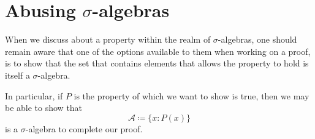 \documentclass[notoc,notitlepage]{tufte-book}
\begin{document}
\section{Abusing \texorpdfstring{$\sigma$}{sigma}-algebras}%
\label{sec:abusing_sigma_algebras}

When we discuss about a property within the realm of $\sigma$-algebras,
one should remain aware that one of the options available to them
when working on a proof, is to show that the set that contains elements
that allows the property to hold is itself a $\sigma$-algebra.

In particular, if $P$ is the property of which we want to show is true,
then we may be able to show that
\begin{equation*}
  \mathcal{A} \coloneqq \{ x : P(x) \}
\end{equation*}
is a $\sigma$-algebra to complete our proof.


\backmatter

\fancyhead[LE]{\thepage \enspace \textsl{\leftmark}}



\printindex
\end{document}
